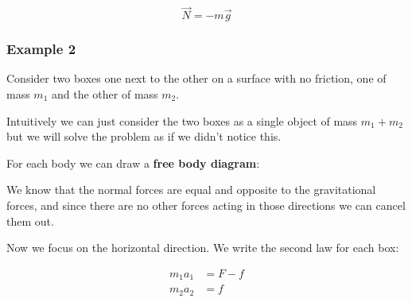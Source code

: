 \documentclass[10pt]{extarticle}
\begin{document}
$$
  \vec N = - m \vec g
$$

\subsubsection{Example 2}

Consider two boxes one next to the other on a surface with no friction, one of mass $m_1$ and the other of mass $m_2$.

\begin{center}
\end{center}

Intuitively we can just consider the two boxes as a single object of mass $m_1 + m_2$ but we will solve the problem as if we didn't notice this.

For each body we can draw a \textbf{free body diagram}:

\begin{center}
\end{center}

We know that the normal forces are equal and opposite to the gravitational forces, and since there are no other forces acting in those directions we can cancel them out.

Now we focus on the horizontal direction.
We write the second law for each box:

\begin{align*}
  m_1 a_1 & = F - f \\
  m_2 a_2 & = f
\end{align*}
\end{document}
